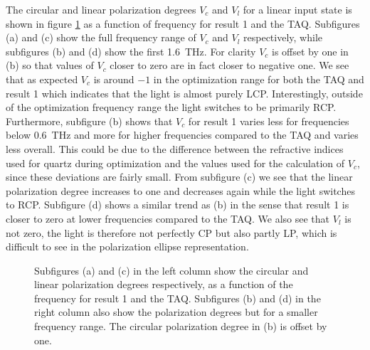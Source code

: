 The circular and linear polarization degrees $V_c$ and $V_l$ for a linear input state is shown in figure \ref{fig:cl4_pol_deg} as a function of frequency for result 1 and the TAQ. Subfigures (a) and (c) show the full frequency range of $V_c$ and $V_l$ respectively, while subfigures (b) and (d) show the first \SI{1.6}{\tera \hertz}. For clarity $V_c$ is offset by one in (b) so that values of $V_c$ closer to zero are in fact closer to negative one. We see that as expected $V_c$ is around $-1$ in the optimization range for both the TAQ and result 1 which indicates that the light is almost purely LCP. Interestingly, outside of the optimization frequency range the light switches to be primarily RCP. Furthermore, subfigure (b) shows that $V_c$ for result 1 varies less for frequencies below \SI{0.6}{\tera \hertz} and more for higher frequencies compared to the TAQ and varies less overall. This could be due to the difference between the refractive indices used for quartz during optimization and the values used for the calculation of $V_c$, since these deviations are fairly small. From subfigure (c) we see that the linear polarization degree increases to one and decreases again while the light switches to RCP. Subfigure (d) shows a similar trend as (b) in the sense that result 1 is closer to zero at lower frequencies compared to the TAQ. We also see that $V_l$ is not zero, the light is therefore not perfectly CP but also partly LP, which is difficult to see in the polarization ellipse representation. 

\begin{figure}[H]
\centering
\subcaptionbox{\label{fig:cl4_pol_deg_a}}
    {\hspace*{-2em}}
\qquad
\subcaptionbox{\label{fig:cl4_pol_deg_b}}
    {\hspace*{-2em}}

\subcaptionbox{\label{fig:cl4_pol_deg_c}}
    {\hspace*{-2em}}
\qquad
\subcaptionbox{\label{fig:cl4_pol_deg_d}}
    {\hspace*{-2em}}
\caption{Subfigures (a) and (c) in the left column show the circular and linear polarization degrees respectively, as a function of the frequency for result 1 and the TAQ. Subfigures (b) and (d) in the right column also show the polarization degrees but for a smaller frequency range. The circular polarization degree in (b) is offset by one.}
\label{fig:cl4_pol_deg}
\end{figure}

